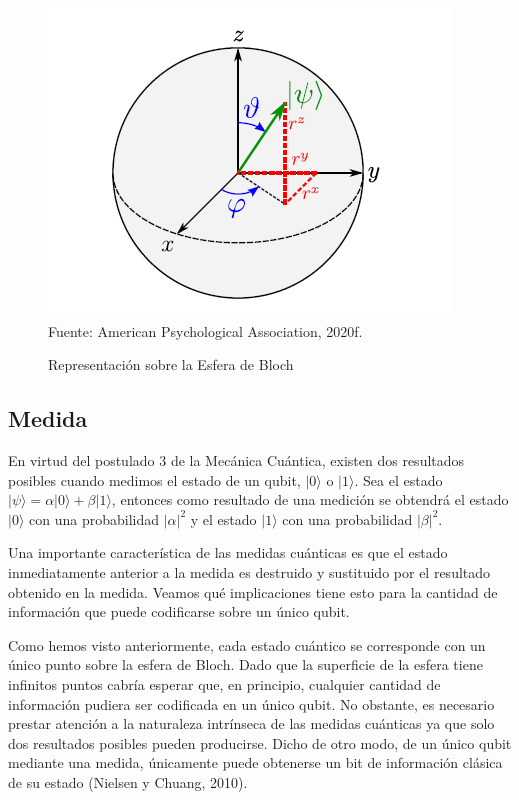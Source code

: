 \begin{figure}[ht]
	\begin{center}
		\caption{Representación sobre la Esfera de Bloch}
		\label{fig:fig-1}
		\includegraphics[width=0.5\linewidth]{Bloch.PNG}
		\small Fuente: American Psychological Association, 2020f.
	\end{center}
\end{figure}

\subsection{Medida}

En virtud del postulado 3 de la Mecánica Cuántica, existen dos resultados posibles cuando medimos el estado de un qubit, $ |0 \rangle $ o $ | 1 \rangle$. Sea el estado $ | \psi \rangle = \alpha | 0 \rangle + \beta | 1 \rangle$, entonces como resultado de una medición se obtendrá el estado $| 0 \rangle$ con una probabilidad $ | \alpha|^2$ y el estado $ | 1 \rangle $ con una probabilidad $ | \beta |^2$.

Una importante característica de las medidas cuánticas es que el estado inmediatamente anterior a la medida es destruido y sustituido por el resultado obtenido en la medida. Veamos qué implicaciones tiene esto para la cantidad de información que puede codificarse sobre un único qubit.

Como hemos visto anteriormente, cada estado cuántico se corresponde con un único punto sobre la esfera de Bloch. Dado que la superficie de la esfera tiene infinitos puntos cabría esperar que, en principio, cualquier cantidad de información pudiera ser codificada en un único qubit. No obstante, es necesario prestar atención a la naturaleza intrínseca de las medidas cuánticas ya que solo dos resultados posibles pueden producirse. Dicho de otro modo, de un único qubit mediante una medida, únicamente puede obtenerse un bit de información clásica de su estado (Nielsen y Chuang, 2010).

